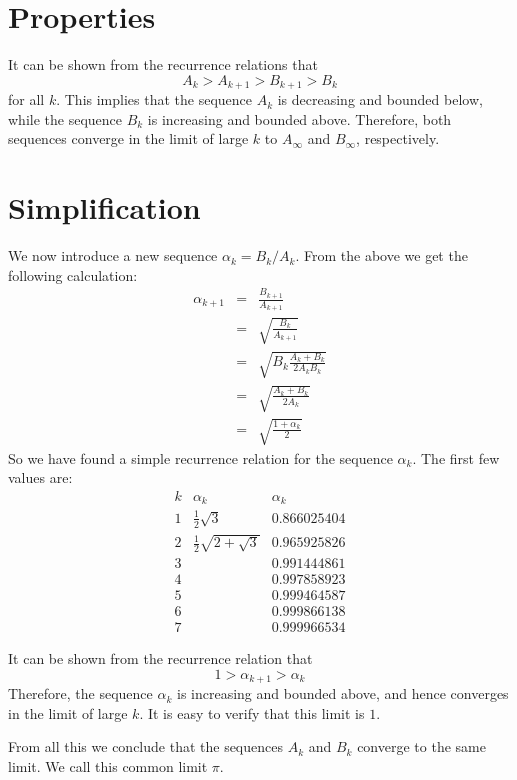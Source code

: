 \documentclass[12pt,oneside,a4paper]{article}
\begin{document}
\section{Properties}
It can be shown from the recurrence relations that
$$
A_k > A_{k+1} > B_{k+1} > B_k
$$
for all $k$.
This implies that the sequence $A_k$ is decreasing and bounded below, while the sequence $B_k$ is increasing and bounded
above. Therefore, both sequences converge in the limit of large $k$ to $A_\infty$ and $B_\infty$, respectively.

\section{Simplification}
We now introduce a new sequence $\alpha_k = B_k/A_k$.
From the above we get the following calculation:
\begin{eqnarray*}
    \alpha_{k+1} &=& \frac{B_{k+1}}{A_{k+1}} \\
    &=& \sqrt{\frac{B_k}{A_{k+1}}} \\
    &=& \sqrt{B_k \frac{A_k+B_k}{2A_kB_k}} \\
    &=& \sqrt{\frac{A_k+B_k}{2A_k}} \\
    &=& \sqrt{\frac{1+\alpha_k}{2}}
\end{eqnarray*}
So we have found a simple recurrence relation for the sequence $\alpha_k$. The first few values are:
$$
\begin{array}{r|c|l}
    k & \alpha_k & \alpha_k \\ \hline
    1 & \frac12 \sqrt{3} & 0.866025404 \\ \hline
    2 & \frac12 \sqrt{2+\sqrt3} & 0.965925826 \\ \hline
    3 & & 0.991444861 \\ \hline
    4 & & 0.997858923 \\ \hline
    5 & & 0.999464587 \\ \hline
    6 & & 0.999866138 \\ \hline
    7 & & 0.999966534
\end{array}
$$

It can be shown from the recurrence relation that
$$
1 > \alpha_{k+1} > \alpha_k
$$
Therefore, the sequence $\alpha_k$ is increasing and bounded above, and hence converges in the limit of large $k$.
It is easy to verify that this limit is $1$.

From all this we conclude that the sequences $A_k$ and $B_k$ converge to the same limit. We call this common limit
$\pi$.
\end{document}
